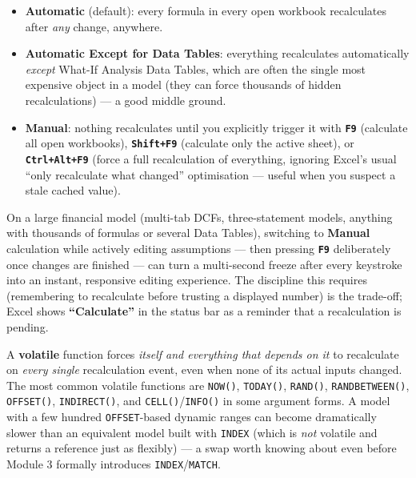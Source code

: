 \documentclass[11pt,a4paper]{article}
\newcommand{\key}[1]{\texttt{\colorbox{black!8}{\textbf{#1}}}}
\begin{document}
\begin{formulasyntax}
\begin{itemize}
  \item \textbf{Automatic} (default): every formula in every open workbook recalculates after \emph{any} change, anywhere.
  \item \textbf{Automatic Except for Data Tables}: everything recalculates automatically \emph{except} What-If Analysis Data Tables, which are often the single most expensive object in a model (they can force thousands of hidden recalculations) --- a good middle ground.
  \item \textbf{Manual}: nothing recalculates until you explicitly trigger it with \key{F9} (calculate all open workbooks), \key{Shift+F9} (calculate only the active sheet), or \key{Ctrl+Alt+F9} (force a full recalculation of everything, ignoring Excel's usual ``only recalculate what changed'' optimisation --- useful when you suspect a stale cached value).
\end{itemize}
\end{formulasyntax}

\begin{protip}
On a large financial model (multi-tab DCFs, three-statement models, anything with thousands of formulas or several Data Tables), switching to \textbf{Manual} calculation while actively editing assumptions --- then pressing \key{F9} deliberately once changes are finished --- can turn a multi-second freeze after every keystroke into an instant, responsive editing experience. The discipline this requires (remembering to recalculate before trusting a displayed number) is the trade-off; Excel shows \textbf{``Calculate''} in the status bar as a reminder that a recalculation is pending.
\end{protip}

\begin{pitfall}
A \textbf{volatile} function forces \emph{itself and everything that depends on it} to recalculate on \emph{every single} recalculation event, even when none of its actual inputs changed. The most common volatile functions are \texttt{NOW()}, \texttt{TODAY()}, \texttt{RAND()}, \texttt{RANDBETWEEN()}, \texttt{OFFSET()}, \texttt{INDIRECT()}, and \texttt{CELL()}/\texttt{INFO()} in some argument forms. A model with a few hundred \texttt{OFFSET}-based dynamic ranges can become dramatically slower than an equivalent model built with \texttt{INDEX} (which is \emph{not} volatile and returns a reference just as flexibly) --- a swap worth knowing about even before Module 3 formally introduces \texttt{INDEX}/\texttt{MATCH}.
\end{pitfall}
\end{document}
